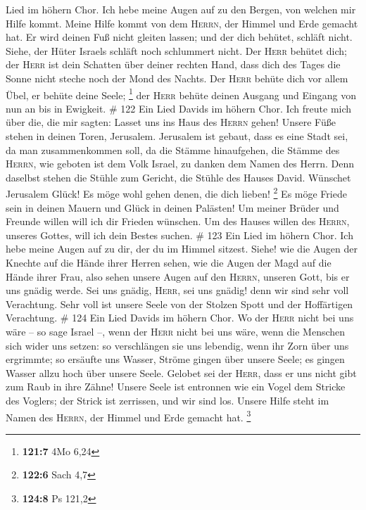 Lied im höhern Chor. Ich hebe meine Augen auf zu den Bergen, von welchen
mir Hilfe kommt.  Meine Hilfe kommt von dem
\textsc{Herrn}, der Himmel und Erde gemacht hat.  Er wird
deinen Fuß nicht gleiten lassen; und der dich behütet, schläft nicht.
 Siehe, der Hüter Israels schläft noch schlummert nicht.
 Der \textsc{Herr} behütet dich; der \textsc{Herr} ist
dein Schatten über deiner rechten Hand,  dass dich des
Tages die Sonne nicht steche noch der Mond des Nachts. 
Der \textsc{Herr} behüte dich vor allem Übel, er behüte deine Seele;
\footnote{\textbf{121:7} 4Mo 6,24}  der \textsc{Herr}
behüte deinen Ausgang und Eingang von nun an bis in Ewigkeit. \# 122
 Ein Lied Davids im höhern Chor. Ich freute mich über die,
die mir sagten: Lasset uns ins Haus des \textsc{Herrn} gehen!
 Unsere Füße stehen in deinen Toren, Jerusalem.
 Jerusalem ist gebaut, dass es eine Stadt sei, da man
zusammenkommen soll,  da die Stämme hinaufgehen, die
Stämme des \textsc{Herrn}, wie geboten ist dem Volk Israel, zu danken
dem Namen des Herrn.  Denn daselbst stehen die Stühle zum
Gericht, die Stühle des Hauses David.  Wünschet Jerusalem
Glück! Es möge wohl gehen denen, die dich lieben! \footnote{\textbf{122:6}
  Sach 4,7}  Es möge Friede sein in deinen Mauern und
Glück in deinen Palästen!  Um meiner Brüder und Freunde
willen will ich dir Frieden wünschen.  Um des Hauses
willen des \textsc{Herrn}, unseres Gottes, will ich dein Bestes suchen.
\# 123  Ein Lied im höhern Chor. Ich hebe meine Augen auf
zu dir, der du im Himmel sitzest.  Siehe! wie die Augen
der Knechte auf die Hände ihrer Herren sehen, wie die Augen der Magd auf
die Hände ihrer Frau, also sehen unsere Augen auf den \textsc{Herrn},
unseren Gott, bis er uns gnädig werde.  Sei uns gnädig,
\textsc{Herr}, sei uns gnädig! denn wir sind sehr voll Verachtung.
 Sehr voll ist unsere Seele von der Stolzen Spott und der
Hoffärtigen Verachtung. \# 124  Ein Lied Davids im höhern
Chor. Wo der \textsc{Herr} nicht bei uns wäre -- so sage Israel --,
 wenn der \textsc{Herr} nicht bei uns wäre, wenn die
Menschen sich wider uns setzen:  so verschlängen sie uns
lebendig, wenn ihr Zorn über uns ergrimmte;  so ersäufte
uns Wasser, Ströme gingen über unsere Seele;  es gingen
Wasser allzu hoch über unsere Seele.  Gelobet sei der
\textsc{Herr}, dass er uns nicht gibt zum Raub in ihre Zähne!
 Unsere Seele ist entronnen wie ein Vogel dem Stricke des
Voglers; der Strick ist zerrissen, und wir sind los. 
Unsere Hilfe steht im Namen des \textsc{Herrn}, der Himmel und Erde
gemacht hat. \footnote{\textbf{124:8} Ps 121,2}

